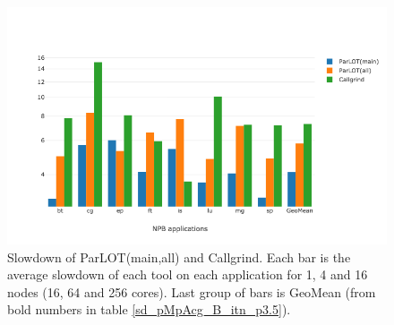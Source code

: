 \begin{figure}[!t]
\centering
\includegraphics[width=5in]{figs.psc/chartAvg_sd_B_p3_5.png}
\caption{ Slowdown of ParLOT(main,all) and Callgrind. Each bar is the average slowdown of each tool on each application for 1, 4 and 16 nodes (16, 64 and 256 cores). Last group of bars is GeoMean (from bold numbers in table \ref{sd_pMpAcg_B_itn_p3.5}). 
}
\label{chartAvg_sd_B_p3_5}
\end{figure}





